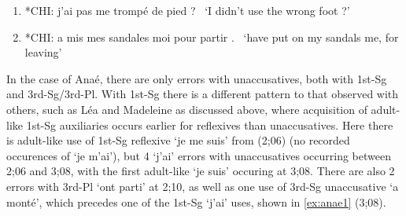 \documentclass[
  12pt,
]{article}
\begin{document}
\begin{enumerate}[resume*]
  \item{*CHI:   j'ai pas me trompé de pied ? \label{ex:Greg1}}\newline
  \     `I didn't use the wrong foot ?'
  \item{*CHI:   a mis mes sandales moi pour partir . \label{ex:Greg2}}\newline
  \     `have put on my sandals me, for leaving'
\end{enumerate}

In the case of Anaé, there are only errors with unaccusatives, both with 1st-Sg and 3rd-Sg/3rd-Pl. With 1st-Sg there is a different pattern to that observed with others, such as Léa and Madeleine as discussed above, where acquisition of adult-like 1st-Sg auxiliaries occurs earlier for reflexives than unaccusatives. Here there is adult-like use of 1st-Sg reflexive `je me suis' from (2;06) (no recorded occurences of `je m'ai'), but 4 `j'ai' errors with unaccusatives occurring between 2;06 and 3;08, with the first adult-like `je suis' occuring at 3;08. There are also 2 errors with 3rd-Pl `ont parti' at 2;10, as well as one use of 3rd-Sg unaccusative `a monté', which precedes one of the 1st-Sg `j'ai' uses, shown in \ref{ex:anae1} (3;08).
\end{document}
